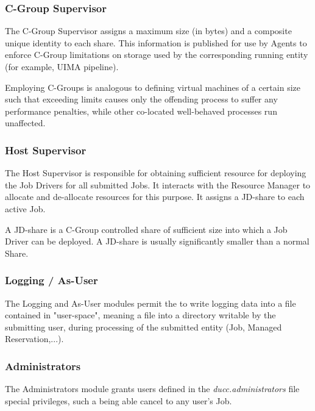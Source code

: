 \begin{itemize}
\begin{description}
    \end{description} 
    
    \subsubsection{C-Group Supervisor}  
    
    The C-Group Supervisor assigns a maximum size (in bytes) and a composite
    unique identity to each \varDUCC share. This information is published for use
    by Agents to enforce C-Group limitations on storage used by the corresponding
    running entity (for example, UIMA pipeline).
    
    Employing C-Groups is analogous to defining virtual machines of a certain
    size such that exceeding limits causes only the offending process to suffer
    any performance penalties, while other co-located well-behaved processes
    run unaffected.
    
    \subsubsection{Host Supervisor}
    
    The Host Supervisor is responsible for obtaining sufficient resource for
    deploying the Job Drivers for all submitted Jobs. It interacts with the
    Resource Manager to allocate and de-allocate resources for this purpose.
    It assigns a JD-share to each active Job.
    
    A JD-share is a C-Group controlled share of sufficient size into which a Job
    Driver can be deployed.  A JD-share is usually significantly smaller than
    a normal Share.
    
    \subsubsection{Logging / As-User} 
    
    The Logging and As-User modules permit the \varOrchestrator to write logging data into
    a file contained in "user-space", meaning a file into a directory writable 
    by the submitting user, during processing of the submitted entity 
    (Job, Managed Reservation,...).
        
    \subsubsection{Administrators} 
    
    The Administrators module grants users defined in the \textit{ducc.administrators}
    file special privileges, such a being able cancel to any user's Job.
    

\end{itemize}

